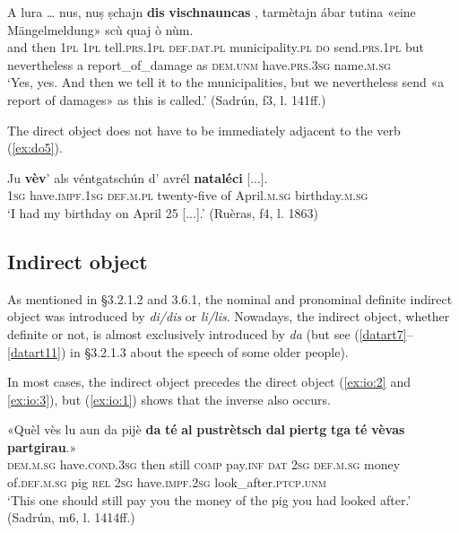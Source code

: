\ea\label{ex:noobj3}
\gll  A lura … nus, nuṣ ṣchajn {\ob}\textbf{dis} \textbf{vischnauncas}{\cb} {\ob}\textbf{{\longrule}}{\cb}, tarmètajn ábar tutina «eine Mängelmeldung»\footnotemark{} scù quaj ò nùm.  \\
and then {} \textsc{1pl} \textsc{1pl} tell.\textsc{prs.1pl} \textsc{def.dat.pl} municipality.\textsc{pl} \textsc{do} send.\textsc{prs.1pl} but nevertheless a report\_of\_damage as \textsc{dem.unm} have.\textsc{prs.3sg} name.\textsc{m.sg}\\
\glt `Yes, yes. And then we tell it to the municipalities, but we nevertheless send «a report of damages» as this is called.' (Sadrún, f3, l. 141ff.)
\z

The direct object does not have to be immediately adjacent to the verb (\ref{ex:do5}).

\ea
\label{ex:do5}
	\gll Ju \textbf{vèv}’ als véntgatschún d’ avrél \textbf{nataléci} [...].   \\
\textsc{1sg} have.\textsc{impf.1sg} \textsc{def.m.pl} twenty-five of April.\textsc{m.sg} birthday.\textsc{m.sg} \\
\glt `I had my birthday on April 25 [...].' (Ruèras, f4, l. 1863)
\z


\subsection{Indirect object}
As mentioned in §3.2.1.2 and 3.6.1, the nominal and pronominal definite indirect object was introduced by \textit{di/dis} or \textit{li/lis}. Nowadays, the indirect object, whether definite or not, is almost exclusively introduced by \textit{da} (but see (\ref{datart7}--\ref{datart11}) in §3.2.1.3 about the speech of some older people).

In most cases, the indirect object precedes the direct object (\ref{ex:io:2} and \ref{ex:io:3}), but (\ref{ex:io:1}) shows that the inverse also occurs.
 
\ea\label{ex:io:2}
\gll  «Quèl vès lu aun da pijè {\ob}\textbf{da} \textbf{té}{\cb} {\ob}\textbf{al} \textbf{pustrètsch} \textbf{dal} \textbf{piertg} \textbf{tga} \textbf{té} \textbf{vèvas} \textbf{partgirau}{\cb}.» \\
\textsc{dem.m.sg} have.\textsc{cond.3sg} then still \textsc{comp} pay.\textsc{inf} \textsc{dat} \textsc{2sg} \textsc{def.m.sg} money of.\textsc{def.m.sg} pig \textsc{rel} \textsc{2sg} have.\textsc{impf.2sg} look\_after.\textsc{ptcp.unm}\\
\glt `This one should still pay you the money of the pig you had looked after.' (Sadrún, m6, l. 1414ff.)
\z


